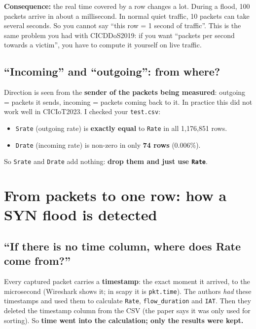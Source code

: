 \documentclass[11pt]{article}
\begin{document}
\textbf{Consequence:} the real time covered by a row changes a lot.
During a flood, 100 packets arrive in about a millisecond. In normal quiet traffic, 10 packets can take several seconds.
So you cannot say ``this row = 1 second of traffic''. This is the same problem you had with CICDDoS2019: if you want ``packets per second
towards a victim'', you have to compute it yourself on live traffic.

\subsection*{``Incoming'' and ``outgoing'': from where?}
Direction is seen from the \textbf{sender of the packets being measured}: outgoing = packets it sends, incoming = packets coming back to it.
In practice this did not work well in CICIoT2023. I checked your \texttt{test.csv}:
\begin{itemize}
\item \texttt{Srate} (outgoing rate) is \textbf{exactly equal} to \texttt{Rate} in all 1{,}176{,}851 rows.
\item \texttt{Drate} (incoming rate) is non-zero in only \textbf{74 rows} (0.006\%).
\end{itemize}
So \texttt{Srate} and \texttt{Drate} add nothing: \textbf{drop them and just use \texttt{Rate}}.

\newpage
\section*{From packets to one row: how a SYN flood is detected}

\subsection*{``If there is no time column, where does Rate come from?''}
Every captured packet carries a \textbf{timestamp}: the exact moment it arrived, to the microsecond (Wireshark shows it; in scapy it is \texttt{pkt.time}).
The authors \emph{had} these timestamps and used them to calculate \texttt{Rate}, \texttt{flow\_duration} and \texttt{IAT}.
Then they deleted the timestamp column from the CSV (the paper says it was only used for sorting).
So \textbf{time went into the calculation; only the results were kept.}
\end{document}
